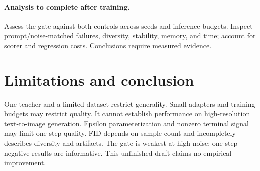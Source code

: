 \documentclass[10pt,twocolumn,letterpaper]{article}
\begin{document}



\paragraph{Analysis to complete after training.}
Assess the gate against both controls across seeds and inference budgets.
Inspect prompt/noise-matched failures, diversity, stability, memory, and time;
account for scorer and regression costs. Conclusions require measured evidence.

\section{Limitations and conclusion}
One teacher and a limited dataset restrict generality.
\ifStudySD
Small adapters and training budgets may restrict quality.
\else
It cannot establish performance on high-resolution text-to-image generation.
\fi
Epsilon parameterization and nonzero terminal signal may limit one-step quality.
FID depends on sample count and incompletely describes diversity and artifacts.
The gate is weakest at high noise; one-step negative results are informative.
This unfinished draft claims no empirical improvement.

{\small


}
\end{document}
